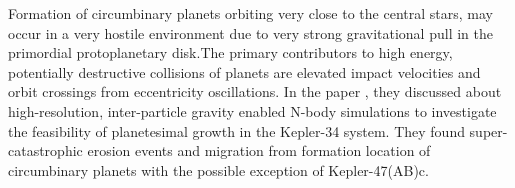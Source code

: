 Formation of circumbinary planets orbiting very close to the central stars, may occur in a very hostile environment due to very strong gravitational pull in the primordial protoplanetary disk.The primary contributors to high energy, potentially destructive collisions of planets are elevated impact velocities and orbit crossings from eccentricity oscillations. In the paper \cite{Lines_2014}, they discussed about high-resolution, inter-particle gravity enabled N-body simulations to investigate the feasibility of planetesimal growth in the Kepler-34 system. They found super-catastrophic erosion events and  migration from formation location of circumbinary planets with the possible exception of Kepler-47(AB)c.
